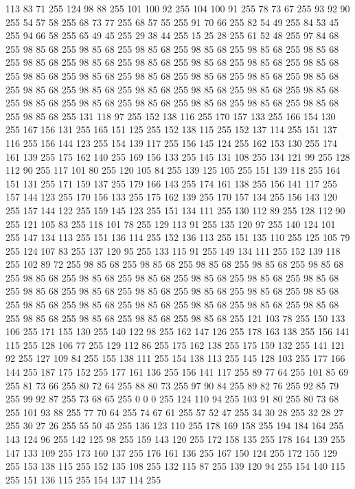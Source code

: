 113 83 71 255 124 98 88 255 101 100 92 255 104 100 91 255 78 73 67 255 93 92 90 255 54 57 58 255 68 73 77 255 68 57 55 255 91 70 66 255 82 54 49 255 84 53 45 255 94 66 58 255 65 49 45 255 29 38 44 255 15 25 28 255 61 52 48 255 97 84 68 255 98 85 68 255 98 85 68 255 98 85 68 255 98 85 68 255 98 85 68 255 98 85 68 255 98 85 68 255 98 85 68 255 98 85 68 255 98 85 68 255 98 85 68 255 98 85 68 255 98 85 68 255 98 85 68 255 98 85 68 255 98 85 68 255 98 85 68 255 98 85 68 255 98 85 68 255 98 85 68 255 98 85 68 255 98 85 68 255 98 85 68 255 98 85 68 255 98 85 68 255 98 85 68 255 98 85 68 255 98 85 68 255 98 85 68 255 98 85 68 255 98 85 68 255 131 118 97 255 152 138 116 255 170 157 133 255 166 154 130 255 167 156 131 255 165 151 125 255 152 138 115 255 152 137 114 255 151 137 116 255 156 144 123 255 154 139 117 255 156 145 124 255 162 153 130 255 174 161 139 255 175 162 140 255
169 156 133 255 145 131 108 255 134 121 99 255 128 112 90 255 117 101 80 255 120 105 84 255 139 125 105 255 151 139 118 255 164 151 131 255 171 159 137 255 179 166 143 255 174 161 138 255 156 141 117 255 157 144 123 255 170 156 133 255 175 162 139 255 170 157 134 255 156 143 120 255 157 144 122 255 159 145 123 255 151 134 111 255 130 112 89 255 128 112 90 255 121 105 83 255 118 101 78 255 129 113 91 255 135 120 97 255 140 124 101 255 147 134 113 255 151 136 114 255 152 136 113 255 151 135 110 255 125 105 79 255 124 107 83 255 137 120 95 255 133 115 91 255 149 134 111 255 152 139 118 255 102 89 72 255 98 85 68 255 98 85 68 255 98 85 68 255 98 85 68 255 98 85 68 255 98 85 68 255 98 85 68 255 98 85 68 255 98 85 68 255 98 85 68 255 98 85 68 255 98 85 68 255 98 85 68 255 98 85 68 255 98 85 68 255 98 85 68 255 98 85 68 255 98 85 68 255 98 85 68 255 98 85 68 255 98 85 68 255 98 85 68 255 98 85 68 255 98 85 68 255 98 85 68 255
98 85 68 255 98 85 68 255 121 103 78 255 150 133 106 255 171 155 130 255 140 122 98 255 162 147 126 255 178 163 138 255 156 141 115 255 128 106 77 255 129 112 86 255 175 162 138 255 175 159 132 255 141 121 92 255 127 109 84 255 155 138 111 255 154 138 113 255 145 128 103 255 177 166 144 255 187 175 152 255 177 161 136 255 156 141 117 255 89 77 64 255 101 85 69 255 81 73 66 255 80 72 64 255 88 80 73 255 97 90 84 255 89 82 76 255 92 85 79 255 99 92 87 255 73 68 65 255 0 0 0 255 124 110 94 255 103 91 80 255 80 73 68 255 101 93 88 255 77 70 64 255 74 67 61 255 57 52 47 255 34 30 28 255 32 28 27 255 30 27 26 255 55 50 45 255 136 123 110 255 178 169 158 255 194 184 164 255 143 124 96 255 142 125 98 255 159 143 120 255 172 158 135 255 178 164 139 255 147 133 109 255 173 160 137 255 176 161 136 255 167 150 124 255 172 155 129 255 153 138 115 255 152 135 108 255 132 115 87 255 139 120 94 255 154 140 115 255 151 136 115 255 154 137 114 255
